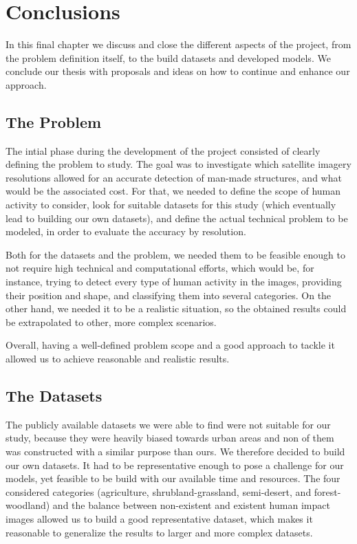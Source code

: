 
\chapter{Conclusions}

\label{Chapter6}


In this final chapter we discuss and close the different aspects of the project, from the problem definition itself, to the build datasets and developed models. We conclude our thesis with proposals and ideas on how to continue and enhance our approach.

\section{The Problem}

The intial phase during the development of the project consisted of clearly defining the problem to study. The goal was to investigate which satellite imagery resolutions allowed for an accurate detection of man-made structures, and what would be the associated cost. For that, we needed to define the scope of human activity to consider, look for suitable datasets for this study (which eventually lead to building our own datasets), and define the actual technical problem to be modeled, in order to evaluate the accuracy by resolution. 

Both for the datasets and the problem, we needed them to be feasible enough to not require high technical and computational efforts, which would be, for instance, trying to detect every type of human activity in the images, providing their position and shape, and classifying them into several categories. On the other hand, we needed it to be a realistic situation, so the obtained results could be extrapolated to other, more complex scenarios.

Overall, having a well-defined problem scope and a good approach to tackle it allowed us to achieve reasonable and realistic results.

\section{The Datasets}

The publicly available datasets we were able to find were not suitable for our study, because they were heavily biased towards urban areas and non of them was constructed with a similar purpose than ours. We therefore decided to build our own datasets. It had to be representative enough to pose a challenge for our models, yet feasible to be build with our available time and resources. The four considered categories (agriculture, shrubland-grassland, semi-desert, and forest-woodland) and the balance between non-existent and existent human impact images allowed us to build a good representative dataset, which makes it reasonable to generalize the results to larger and more complex datasets.

